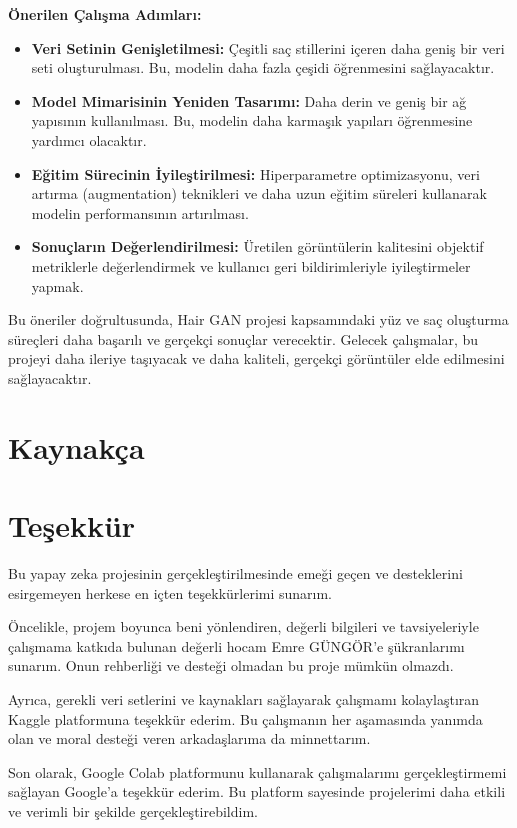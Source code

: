 \documentclass[12pt]{article}
\begin{document}
\textbf{Önerilen Çalışma Adımları:}
\begin{itemize}
    \item \textbf{Veri Setinin Genişletilmesi:} Çeşitli saç stillerini içeren daha geniş bir veri seti oluşturulması. Bu, modelin daha fazla çeşidi öğrenmesini sağlayacaktır.
    \item \textbf{Model Mimarisinin Yeniden Tasarımı:} Daha derin ve geniş bir ağ yapısının kullanılması. Bu, modelin daha karmaşık yapıları öğrenmesine yardımcı olacaktır.
    \item \textbf{Eğitim Sürecinin İyileştirilmesi:} Hiperparametre optimizasyonu, veri artırma (augmentation) teknikleri ve daha uzun eğitim süreleri kullanarak modelin performansının artırılması.
    \item \textbf{Sonuçların Değerlendirilmesi:} Üretilen görüntülerin kalitesini objektif metriklerle değerlendirmek ve kullanıcı geri bildirimleriyle iyileştirmeler yapmak.
\end{itemize}

Bu öneriler doğrultusunda, Hair GAN projesi kapsamındaki yüz ve saç oluşturma süreçleri daha başarılı ve gerçekçi sonuçlar verecektir. Gelecek çalışmalar, bu projeyi daha ileriye taşıyacak ve daha kaliteli, gerçekçi görüntüler elde edilmesini sağlayacaktır.
\section{Kaynakça}
\printbibliography
\section{Teşekkür}
Bu yapay zeka projesinin gerçekleştirilmesinde emeği geçen ve desteklerini esirgemeyen herkese en içten teşekkürlerimi sunarım.

Öncelikle, projem boyunca beni yönlendiren, değerli bilgileri ve tavsiyeleriyle çalışmama katkıda bulunan değerli hocam Emre GÜNGÖR'e  şükranlarımı sunarım. Onun rehberliği ve desteği olmadan bu proje mümkün olmazdı.

Ayrıca, gerekli veri setlerini ve kaynakları sağlayarak çalışmamı kolaylaştıran Kaggle platformuna  teşekkür ederim. Bu çalışmanın her aşamasında yanımda olan ve moral desteği veren arkadaşlarıma da minnettarım.

Son olarak, Google Colab platformunu kullanarak çalışmalarımı gerçekleştirmemi sağlayan Google'a teşekkür ederim. Bu platform sayesinde projelerimi daha etkili ve verimli bir şekilde gerçekleştirebildim.
\end{document}
